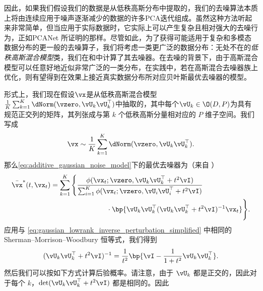 \documentclass[../../book-main_zh.tex]{subfiles}
\begin{document}
因此，如果我们假设我们的数据是从低秩高斯分布中提取的，我们的去噪算法本质上将由连续应用于噪声逐渐减少的数据的许多PCA迭代组成。虽然这种方法听起来非常简单，但当应用于实际数据时，它实际上可以产生复杂且相对强大的去噪行为，正如PCANet \parencite{chan2015pcanet}所证明的那样。尽管如此，为了获得可能适用于复杂和多模态数据分布的更一般的去噪算子，我们将考虑一类更广泛的数据分布：无处不在的\textit{低秩高斯混合模型}类，我们在和中计算了其去噪器。在去噪的背景下，由于高斯混合模型可以任意好地近似非常广泛的一类分布，在实践中，若在高斯混合去噪器族上优化，则有望得到在效果上接近真实数据分布所对应贝叶斯最优去噪器的模型。

形式上，我们现在假设\(\vx\)是从低秩高斯混合模型\(\frac{1}{K}\sum_{k = 1}^{K}\dNorm(\vzero, \vU_{k}\vU_{k}^{\top})\)中抽取的，其中每个\(\vU_{k} \in \O(D, P)\)为具有规范正交列的矩阵，其列张成与第 \(k\) 个低秩高斯分量相对应的 \(P\) 维子空间。我们写成
\begin{equation}\label{eq:MoG1}
    \vx \sim \frac{1}{K}\sum_{k = 1}^{K}\dNorm(\vzero, \vU_{k}\vU_{k}^{\top}).
\end{equation}
那么\eqref{eq:additive_gaussian_noise_model}下的最优去噪器为（来自
）
\begin{align}
    \bar{\vx}^{\ast}(t, \vx_{t})
    &= \sum_{k = 1}^{K}\Bigg\{\frac{\phi(\vx_{t} ; \vzero,
        \vU_{k}\vU_{k}^{\top} + t^{2}\vI)}{\sum_{i = 1}^{K}\phi(\vx_{t} ;
                \vzero, \vU_{i}\vU_{i}^{\top} +
        t^{2}\vI)} \\
        &\qquad \qquad \qquad \qquad
        \cdot\bp{\vU_{k}\vU_{k}^{\top}(\vU_{k}\vU_{k}^{\top} +
    t^{2}\vI)^{-1}\vx_{t}}\Bigg\}.
\end{align}
应用与 \eqref{eq:gaussian_lowrank_inverse_perturbation_simplified} 中相同的 Sherman--Morrison--Woodbury 恒等式，我们得到
\begin{equation}
    (\vU_{k}\vU_{k}^{\top} + t^{2}\vI)^{-1} = \frac{1}{t^{2}}\bp{\vI
    - \frac{1}{1 + t^{2}}\vU_{k}\vU_{k}^{\top}}.
\end{equation}
然后我们可以按如下方式计算后验概率。请注意，由于 \(\vU_{k}\) 都是正交的，因此对于每个 \(k\)，\(\det(\vU_{k}\vU_{k}^{\top}
+ t^{2}\vI)\) 都是相同的。因此
\end{document}

